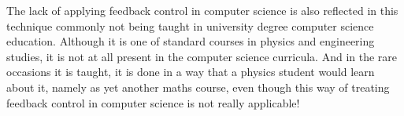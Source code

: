 The lack of applying feedback control in computer science is also reflected in this technique commonly not being taught in university degree computer science education. Although it is one of standard courses in physics and engineering studies, it is not at all present in the computer science curricula. And in the rare occasions it is taught, it is done in a way that a physics student would learn about it, namely as yet another maths course, even though this way of treating feedback control in computer science is not really applicable!





